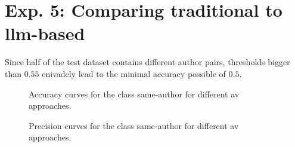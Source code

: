 \section{Exp. 5: Comparing traditional to \ac{llm}-based \imps{}}

Since half of the test dataset contains different author pairs, thresholds bigger than $0.55$ enivadely lead to the minimal accuracy possible of $0.5$.

\begin{figure}[htbp]
  \centering
    
  \caption{Accuracy curves for the class same-author for different \ac{av} approaches.}
  \label{fig:comp_av_acc}
\end{figure}


\begin{figure}[htbp]
  \centering
    
  \caption{Precision curves for the class same-author for different \ac{av} approaches.}
  \label{fig:comp_av_prec}
\end{figure}